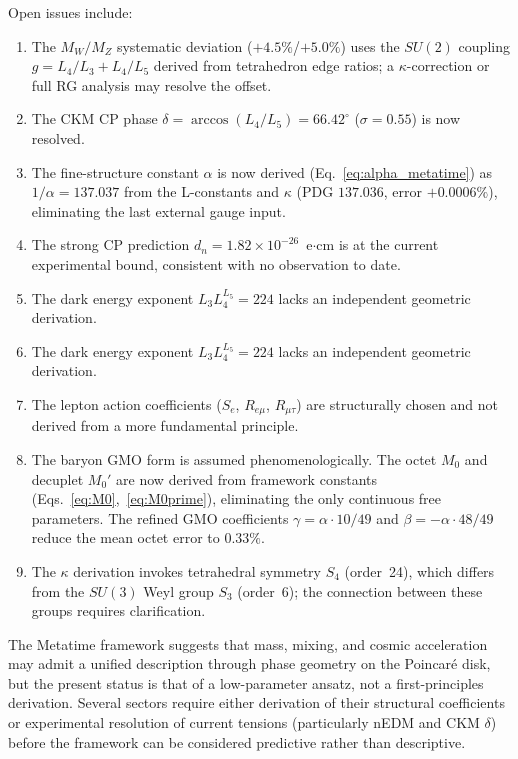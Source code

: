\documentclass[aps,prd,reprint,twocolumn,showpacs,superscriptaddress]{revtex4-2}
\begin{document}
Open issues include:
\begin{enumerate}
\item The $M_W/M_Z$ systematic deviation ($+4.5\%$/$+5.0\%$) uses the
$SU(2)$ coupling $g = L_4/L_3 + L_4/L_5$ derived from tetrahedron edge
ratios; a $\kappa$-correction or full RG analysis may resolve the offset.
\item The CKM CP phase $\delta = \arccos(L_4/L_5) = 66.42^\circ$ ($\sigma = 0.55$) is now resolved.
\item The fine-structure constant $\alpha$ is now derived
(Eq.~\eqref{eq:alpha_metatime}) as $1/\alpha = 137.037$ from
the L-constants and $\kappa$ (PDG $137.036$, error $+0.0006\%$),
eliminating the last external gauge input.
\item The strong CP prediction $d_n = 1.82\times 10^{-26}$~e$\cdot$cm
is at the current experimental bound, consistent with no observation
to date.
\item The dark energy exponent $L_3 L_4^{L_5} = 224$ lacks an
independent geometric derivation.
\item The dark energy exponent $L_3 L_4^{L_5} = 224$ lacks an
independent geometric derivation.
\item The lepton action coefficients ($S_e$, $R_{e\mu}$, $R_{\mu\tau}$)
are structurally chosen and not derived from a more fundamental
principle.
\item The baryon GMO form is assumed phenomenologically.  The octet
$M_0$ and decuplet $M_0'$ are now derived from framework constants
(Eqs.~\eqref{eq:M0},~\eqref{eq:M0prime}), eliminating the only
continuous free parameters.  The refined GMO coefficients
$\gamma = \alpha\cdot 10/49$ and $\beta = -\alpha\cdot 48/49$ reduce
the mean octet error to $0.33\%$.
\item The $\kappa$ derivation invokes tetrahedral symmetry $S_4$
(order~24), which differs from the $SU(3)$ Weyl group $S_3$ (order~6);
the connection between these groups requires clarification.
\end{enumerate}

The Metatime framework suggests that mass, mixing, and cosmic
acceleration may admit a unified description through phase geometry
on the Poincar\'{e} disk, but the present status is that of a
low-parameter ansatz, not a first-principles derivation.  Several
sectors require either derivation of their structural coefficients
or experimental resolution of current tensions (particularly nEDM
and CKM $\delta$) before the framework can be considered predictive
rather than descriptive.
\end{document}
